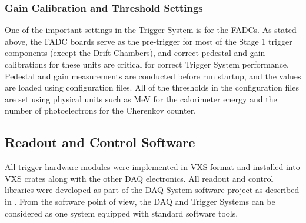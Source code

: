 \subsubsection{Gain Calibration and Threshold Settings}

One of the important settings in the Trigger System is for the FADCs. As stated above, the FADC boards serve as the pre-trigger for most of the Stage 1 trigger components (except the Drift Chambers), and correct pedestal and gain calibrations for these units are critical for correct Trigger System performance. Pedestal and gain measurements are conducted before run startup, and the values are loaded using configuration files. All of the thresholds in the configuration files are set using physical units such as MeV for the calorimeter energy and the number of photoelectrons for the Cherenkov counter.


\subsection{Readout and Control Software}

All trigger hardware modules were implemented in VXS format and installed into VXS crates along with the other DAQ electronics. All readout and control libraries were developed as part of the DAQ System software project as described in \cite{daq-ref}. From the software point of view, the DAQ and Trigger Systems can be considered as one system equipped with standard software tools.